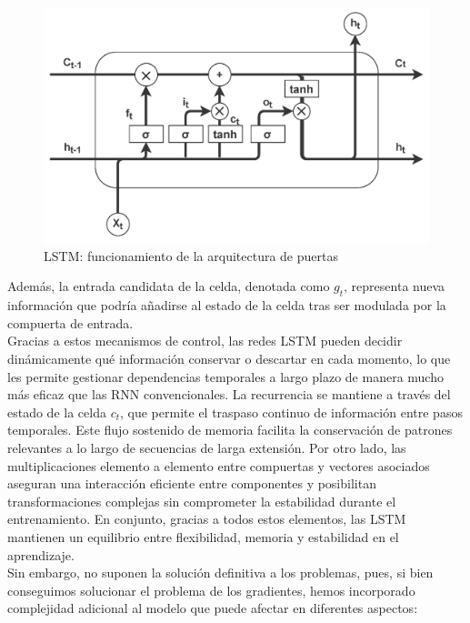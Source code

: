 \begin{figure}[H] %
    \centering
    \includegraphics[scale=1]{img/lstm}
    \caption{LSTM: funcionamiento de la arquitectura de puertas}
    \label{lstm}
\end{figure}


Además, la entrada candidata de la celda, denotada como $g_t$, representa nueva información que podría añadirse al estado de la celda tras ser modulada por la compuerta de entrada.\\

Gracias a estos mecanismos de control, las redes LSTM pueden decidir dinámicamente qué información conservar o descartar en cada momento, lo que les permite gestionar dependencias temporales a largo plazo de manera mucho más eficaz que las RNN convencionales. La recurrencia se mantiene a través del estado de la celda $c_t$, que permite el traspaso continuo de información entre pasos temporales. Este flujo sostenido de memoria facilita la conservación de patrones relevantes a lo largo de secuencias de larga extensión. Por otro lado, las multiplicaciones elemento a elemento entre compuertas y vectores asociados aseguran una interacción eficiente entre componentes y posibilitan transformaciones complejas sin comprometer la estabilidad durante el entrenamiento. En conjunto, gracias a todos estos elementos, las LSTM mantienen un equilibrio entre flexibilidad, memoria y estabilidad en el aprendizaje.\\

Sin embargo, no suponen la solución definitiva a los problemas, pues, si bien conseguimos solucionar el problema de los gradientes, hemos incorporado complejidad adicional al modelo que puede afectar en diferentes aspectos:

